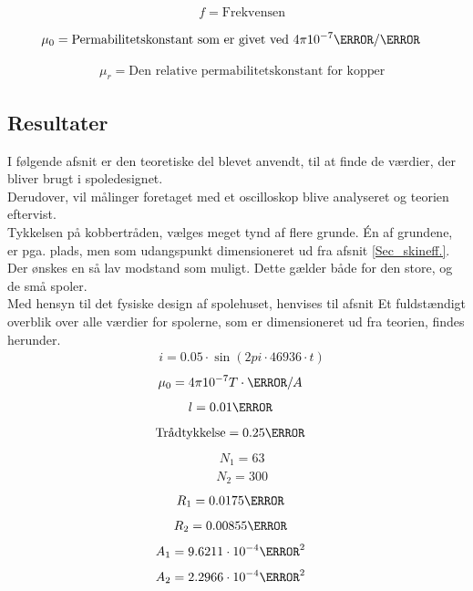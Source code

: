 \begin{align}
	& f = \text{Frekvensen} \nonumber
\end{align}

\begin{align}
	& \mu_0 = \text{Permabilitetskonstant som er givet ved $4\pi 10^{-7}\henry/\meter$} \nonumber
\end{align}

\begin{align}
	& \mu_r = \text{Den relative permabilitetskonstant for kopper} \nonumber
\end{align}


\subsection{Resultater}
I følgende afsnit er den teoretiske del blevet anvendt, til at finde de værdier, der bliver brugt i spoledesignet.\\
Derudover, vil målinger foretaget med et oscilloskop blive analyseret og teorien eftervist.\\ 
Tykkelsen på kobbertråden, vælges meget tynd af flere grunde.
Én af grundene, er pga. plads, men som udangspunkt dimensioneret ud fra afsnit \ref{Sec_skineff.}. \\
Der ønskes en så lav modstand som muligt.  
Dette gælder både for den store, og de små spoler.\\
Med hensyn til det fysiske design af spolehuset, henvises til afsnit
Et fuldstændigt overblik over alle værdier for spolerne, som er dimensioneret ud fra teorien, findes herunder.
\begin{align}
&i=0.05\cdot \sin{(2pi\cdot 46936\cdot t)} \nonumber
\end{align}
\begin{align}
&\mu_0 =4\pi 10^{-7}T\cdot \m/A \nonumber
\end{align}
\begin{align}
&l = 0.01\m \nonumber
\end{align}
\begin{align}
&\text{Trådtykkelse} = 0.25\mm \nonumber
\end{align}
\begin{align}
&N_1=63\nonumber
\end{align}
\begin{align}
&N_2=300\nonumber
\end{align}
\begin{align}
&R_1=0.0175\m\nonumber
\end{align}
\begin{align}
&R_2=0.00855\m\nonumber
\end{align}
\begin{align}
&A_1=9.6211\cdot 10^{-4} \m^2\nonumber
\end{align}
\begin{align}
&A_2=2.2966\cdot 10^{-4} \m^2\nonumber
\end{align}

